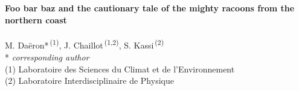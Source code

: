 {
  \raggedright
  \sffamily
  {\huge\bfseries
    Foo bar baz and the cautionary tale of the mighty racoons from the northern coast\\\mbox{}
  }\\
  \vspace{4mm}
  {\large
    M. Daëron*\textsuperscript{\,(1)}, J. Chaillot\textsuperscript{\,(1,2)}, S. Kassi\textsuperscript{\,(2)}
  }\\
  \vspace{8mm}
  {\small
    * {\itshape corresponding author}\\
    (1) Laboratoire des Sciences du Climat et de l'Environnement\\
    (2) Laboratoire Interdisciplinaire de Physique\\
  }
}